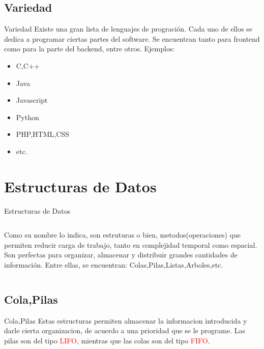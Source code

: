 \documentclass[11pt]{beamer}
\begin{document}
	\subsection{Variedad}	
	    \begin{frame}{Variedad}
			\justifying
			Existe una gran lista de lenguajes de progración. Cada uno de ellos se dedica a programar ciertas partes del software. Se encuentran tanto para frontend como para la parte del backend, entre otros.
			Ejemplos:
			\begin{itemize}
			    \item C,C++
			    \item Java
			    \item Javascript
			    \item Python
			    \item PHP,HTML,CSS
			    \item etc.
			\end{itemize}
		\end{frame}
	
    \section{Estructuras de Datos}
		\begin{frame}{Estructuras de Datos}
			\centering
			\begin{columns}
                \column{2in}
                Como su nombre lo indica, son estruturas o bien, metodos(operaciones) que permiten reducir carga de trabajo, tanto en complejidad temporal como espacial.
    			Son perfectas para organizar, almacenar y distribuir grandes cantidades de información.
                \column{2in}
               Entre ellas, se encuentran: Colas,Pilas,Listas,Arboles,etc.
            \end{columns}
		\end{frame}
	\subsection{Cola,Pilas}	
	    \begin{frame}{Cola,Pilas}
			\justifying
			Estas estructuras permiten almacenar la informacion introducida y darle cierta organizacion, de acuerdo a una prioridad que se le programe. Las pilas son del tipo \textcolor{red}{LIFO}, mientras que las colas son del tipo \textcolor{red}{FIFO}.
		\end{frame}
\end{document}
